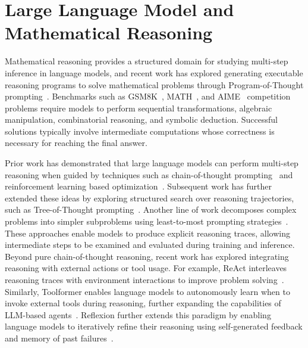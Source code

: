 \documentclass[12pt]{report}
\begin{document}
\section{Large Language Model and Mathematical Reasoning}

Mathematical reasoning provides a structured domain for studying multi-step inference in language models, and recent work has explored generating executable reasoning programs to solve mathematical problems through Program-of-Thought prompting~\cite{chen2023programthoughtspromptingdisentangling}.
Benchmarks such as GSM8K~\cite{cobbe2021trainingverifierssolvemath}, MATH~\cite{hendrycksmath2021}, and AIME~\cite{AIMEProblemsandSolutions-AOPSWiki} competition problems require models to perform sequential transformations, algebraic manipulation, combinatorial reasoning, and symbolic deduction. 
Successful solutions typically involve intermediate computations whose correctness is necessary for reaching the final answer.

Prior work has demonstrated that large language models can perform multi-step reasoning when guided by techniques such as chain-of-thought prompting~\cite{wei2023chainofthoughtpromptingelicitsreasoning} and reinforcement learning based optimization~\cite{shao2024deepseekmathpushinglimitsmathematical, schulman2017proximalpolicyoptimizationalgorithms}. 
Subsequent work has further extended these ideas by exploring structured search over reasoning trajectories, such as Tree-of-Thought prompting~\cite{yao2023treethoughtsdeliberateproblem}.
Another line of work decomposes complex problems into simpler subproblems using least-to-most prompting strategies~\cite{zhou2023leasttomostpromptingenablescomplex}.
These approaches enable models to produce explicit reasoning traces, allowing intermediate steps to be examined and evaluated during training and inference.
Beyond pure chain-of-thought reasoning, recent work has explored integrating reasoning with external actions or tool usage. For example, ReAct interleaves reasoning traces with environment interactions to improve problem solving~\cite{yao2023reactsynergizingreasoningacting}.
Similarly, Toolformer enables language models to autonomously learn when to invoke external tools during reasoning, further expanding the capabilities of LLM-based agents~\cite{schick2023toolformerlanguagemodelsteach}. Reflexion further extends this paradigm by enabling language models to iteratively refine their reasoning using self-generated feedback and memory of past failures~\cite{shinn2023reflexionlanguageagentsverbal}.
\end{document}
